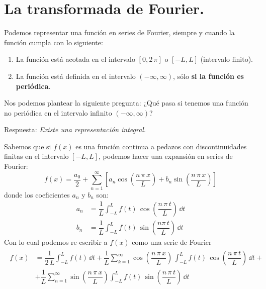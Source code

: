 \section{La transformada de Fourier.}
Podemos representar una función en series de Fourier, siempre y cuando la función cumpla con lo siguiente:
\begin{enumerate}[label=\alph*)]
\item La función está acotada en el intervalo $[0, 2 \, \pi]$ o $[-L, L]$ (intervalo finito).
\item La función está definida en el intervalo $(- \infty, \infty)$, sólo \textbf{si la función es periódica}.
\end{enumerate}
Nos podemos plantear la siguiente pregunta: ¿Qué pasa si tenemos una función no periódica en el intervalo infinito $(-\infty, \infty)$?
\par
Respuesta: \emph{Existe una representación integral}.
\par
Sabemos que si $f(x)$ es una función continua a pedazos con discontinuidades finitas en el intervalo $[-L, L]$, podemos hacer una expansión en series de Fourier:
\begin{equation}
f(x) = \dfrac{a_{0}}{2} + \sum_{n=1}^{\infty} \left[ a_{n} \cos \left( \dfrac{n \, \pi \, x}{L} \right) + b_{n} \sin \left( \dfrac{n \, \pi \, x}{L} \right) \right]
\label{eq:8_11}
\end{equation}
donde los coeficientes $a_{n}$ y $b_{n}$ son:
\begin{align}
a_{n} &= \dfrac{1}{L} \int_{-L}^{L} f(t) \, \cos \left( \dfrac{n \, \pi \, t}{L} \right) \, \dd t \label{eq:15_12} \\[0.5em]
b_{n} &= \dfrac{1}{L} \int_{-L}^{L} f(t) \, \sin \left( \dfrac{n \pi \, t}{L} \right) \, \dd t
\label{eq:ecuacion_15_13}
\end{align}
Con lo cual podemos re-escribir a $f(x)$ como una serie de Fourier
\begin{align}
\begin{aligned}
f(x) &= \dfrac{1}{2 \, L} \int_{-L}^{L} f(t) \, \dd t + \dfrac{1}{L} \sum_{k=1}^{\infty} \cos \left( \dfrac{n \, \pi \, x}{L} \right) \, \int_{-L}^{L} f(t) \, \cos \left( \dfrac{n \, \pi \, t}{L} \right) \, \dd t + \\
&+ \dfrac{1}{L} \sum_{n=1}^{\infty}  \sin \left( \dfrac{n \, \pi \, x}{L} \right) \int_{-L}^{L} f(t) \, \sin \left( \dfrac{n \, \pi \, t}{L} \right) \, \dd t
\label{eq:ecuacion_15_14}
\end{aligned}
\end{align}
